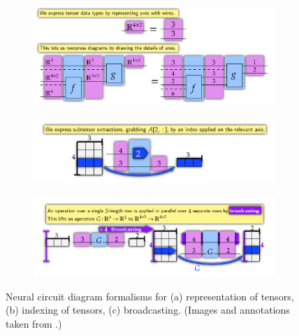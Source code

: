 \documentclass[11pt,a4paper,openright,twoside]{report}
\theoremstyle{plain}
\theoremstyle{definition}
\begin{document}
\begin{figure}[h]
  \begin{center}
    \begin{subfigure}{0.7\textwidth}
      \includegraphics[width=\textwidth]{figures/tensors.png}
      \caption{}
    \end{subfigure}
    \begin{subfigure}{0.7\textwidth}
      \includegraphics[width=\textwidth]{figures/indexing.png}
      \caption{}
    \end{subfigure}
    \begin{subfigure}{0.7\textwidth}
      \includegraphics[width=\textwidth]{figures/broadcasting1.png}
      \caption{}
    \end{subfigure}      
    \caption[Neural circuit diagrams]{Neural circuit diagram formalisms for (a) representation of tensors, (b) indexing of tensors, (c) broadcasting. (Images and annotations taken from \cite{abbott2024neural}.)}
    \label{fig: neuralstringdiagrams}
  \end{center}
\end{figure}
\end{document}
